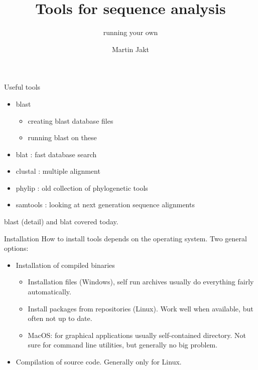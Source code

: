 \documentclass[pdf]{beamer}
\title{Tools for sequence analysis}
\subtitle{running your own}
\author{Martin Jakt}
\begin{document}
\begin{frame}
  \titlepage
\end{frame}

\begin{frame}{Useful tools}
  \begin{itemize}
  \item blast
    \begin{itemize}
    \item creating blast database files
    \item running blast on these
    \end{itemize}
  \item blat : fast database search
  \item clustal : multiple alignment
  \item phylip : old collection of phylogenetic tools
  \item samtools : looking at next generation sequence alignments
  \end{itemize}
  
  blast (detail) and blat covered today.

\end{frame}

\begin{frame}{Installation}
  How to install tools depends on the operating system. Two general options:
  \begin{itemize}
  \item Installation of compiled binaries
    \begin{itemize}
    \item Installation files (Windows), self run archives usually do
      everything fairly automatically.
    \item Install packages from repositories (Linux). Work well when
      available, but often not up to date.
    \item MacOS: for graphical applications usually self-contained
      directory. Not sure for command line utilities, but generally no big
      problem.
    \end{itemize}
  \item Compilation of source code. Generally only for Linux.
  \end{itemize}
\end{frame}
\end{document}
